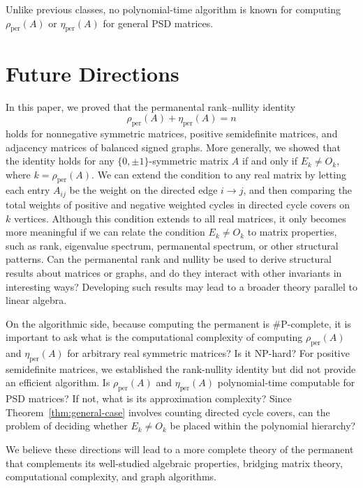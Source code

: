 \documentclass[11pt]{article}
\theoremstyle{plain}
\theoremstyle{definition}
\theoremstyle{remark}
\begin{document}
Unlike previous classes, no polynomial-time algorithm is known for computing \(\rho_{\operatorname{per}}(A)\) or \( \eta_{\operatorname{per}}(A)\) for general PSD matrices.

\section{Future Directions}\label{futuredirections}
In this paper, we proved that the permanental rank–nullity identity
\[
\rho_{\mathrm{per}}(A) + \eta_{\mathrm{per}}(A) = n
\]
holds for nonnegative symmetric matrices, positive semidefinite matrices, and adjacency matrices of balanced signed graphs. More generally, we showed that the identity holds for any $\{0,\pm1\}$-symmetric matrix \(A\) if and only if \(E_k \neq O_k\), where \(k = \rho_{\mathrm{per}}(A)\). 
We can extend the condition to any real matrix by letting each entry \(A_{ij}\) be the weight on the directed edge \(i\to j\), and then comparing the total weights of positive and negative weighted cycles in directed cycle covers on \(k\) vertices.
 Although this condition extends to all real matrices, it only becomes more meaningful if we can relate the condition
\(
E_k \neq O_k
\)
to matrix properties, such as rank, eigenvalue spectrum, permanental spectrum, or other structural patterns.
Can the permanental rank and nullity be used to derive structural results about matrices or graphs, and do they interact with other invariants in interesting ways? Developing such results may lead to a broader theory parallel to linear algebra.


On the algorithmic side, because computing the permanent is \#P-complete, it is important to ask what is the computational complexity of computing \(\rho_{\mathrm{per}}(A)\) and  \(\eta_{\mathrm{per}}(A)\) for arbitrary real symmetric matrices? Is it NP-hard? For positive semidefinite matrices, we established the rank-nullity identity but did not provide an efficient algorithm. Is \(\rho_{\mathrm{per}}(A)\) and  \(\eta_{\mathrm{per}}(A)\) polynomial-time computable for PSD matrices? If not, what is its approximation complexity? 
Since Theorem~\ref{thm:general-case} involves counting directed cycle covers,
can the problem of deciding whether \(E_k \neq O_k\) be placed within the
polynomial hierarchy?

We believe these directions will lead to a more complete theory of the permanent that complements its well-studied algebraic properties, bridging matrix theory, computational complexity, and graph algorithms.
\end{document}

